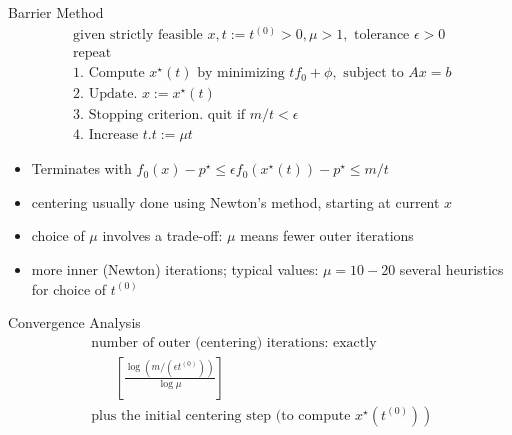 \documentclass{beamer}
\begin{document}
\begin{frame}[noframenumbering]{Barrier Method}
\begin{equation*}
\begin{array}{l}{\text { given strictly feasible } x, t:=t^{(0)}>0, \mu>1, \text { tolerance } \epsilon>0} \\ {\text { repeat }} \\ {\text { 1. Compute } x^{\star}(t) \text { by minimizing } t f_{0}+\phi, \text { subject to } A x=b} \\ {\text { 2. Update. } x:=x^{\star}(t)} \\ {\text { 3. Stopping criterion. quit if } m / t<\epsilon} \\ {\text { 4. Increase } t . t:=\mu t}\end{array}
\end{equation*}

\begin{itemize}
	\item Terminates with $ f_{0}(x)-p^{\star} \leq \epsilon   f_{0}\left(x^{\star}(t)\right)-p^{\star} \leq m / t$
	\item centering usually done using Newton's method, starting at current $x$
	\item choice of $\mu$  involves a trade-off: $ \mu$ means fewer outer iterations
	\item  more inner (Newton) iterations; typical values:  $\mu=10-20$ several heuristics for choice of $ t^{(0)}$
\end{itemize}
\end{frame}



\begin{frame}[noframenumbering]{Convergence Analysis}
\begin{equation*}
\begin{array}{l}{\text { number of outer (centering) iterations: exactly }} \\ {\qquad\left[\frac{\log \left(m /\left(\epsilon t^{(0)}\right)\right)}{\log \mu}\right]} \\ { \text { plus the initial centering step (to compute }\left.x^{\star}\left(t^{(0)}\right)\right)}\end{array}
\end{equation*}
\end{frame}
\end{document}
